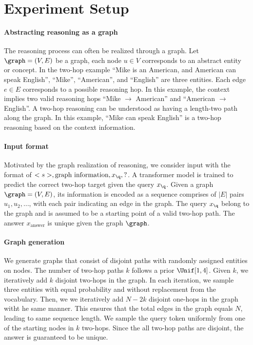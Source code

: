 \section{Experiment Setup}
\paragraph{Abstracting reasoning as a graph} The reasoning process can often be realized through a graph. Let $\graph = (V, E)$ be a graph, each node $u\in V$ corresponds to an abstract entity or concept. In the two-hop example ``Mike is an American, and American can speak English'', ``Mike'', ``American'', and ``English'' are three entities. Each edge $e \in E$ corresponds to a possible reasoning hop. In this example, the context implies two valid reasoning hops ``Mike $\to$ American'' and ``American $\to$ English''. A two-hop reasoning can be understood as having a length-two path along the graph. In this example, ``Mike can speak English'' is a two-hop reasoning based on the context information.

\paragraph{Input format}
Motivated by the graph realization of reasoning, we consider input with the format of $<s>, \text{graph information}, x_\q, ?$. A transformer model is trained to predict the correct two-hop target given the query $x_\q$. Given a graph $\graph=(V,E)$, its information is encoded as a sequence comprises of $|E|$ pairs $u_1, u_2, \ldots $, with each pair indicating an edge in the graph. The query $x_\q$ belong to the graph and is assumed to be a starting point of a valid two-hop path. The answer $x_{\text{answer}}$ is unique given the graph $\graph$.


\paragraph{Graph generation} We generate graphs that consist of disjoint paths with randomly assigned entities on nodes. The number of two-hop paths $k$ follows a prior $\Unif[1, 4]$. Given $k$, we iteratively add $k$ disjoint two-hops in the graph. In each iteration, we sample three entities with equal probability and without replacement from the vocabulary. Then, we we iteratively add $N-2k$ disjoint one-hops in the graph witht he same manner. This ensures that the total edges in the graph equals $N$, leading to same sequence length. We sample the query token uniformly from one of the starting nodes in $k$ two-hops. Since the all two-hop paths are disjoint, the answer is guaranteed to be unique.



